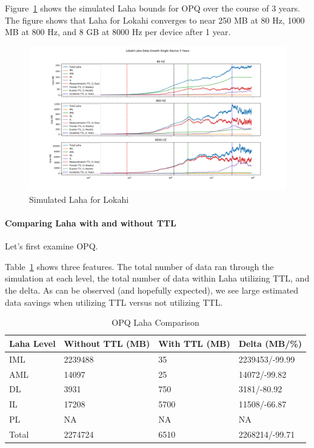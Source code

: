 Figure~\ref{fig:sim_laha_lokahi} shows the simulated Laha bounds for OPQ over the course of 3 years. The figure shows that Laha for Lokahi converges to near 250 MB at 80 Hz, 1000 MB at 800 Hz, and 8 GB at 8000 Hz per device after 1 year.

\begin{figure}[H]
	\centering
	\includegraphics[width=\linewidth]{figures/sim_laha_lokahi.png}
	\caption{Simulated Laha for Lokahi}
	\label{fig:sim_laha_lokahi}
\end{figure}


\paragraph{Comparing Laha with and without TTL}

Let's first examine OPQ\@.

Table~\ref{table:opq_laha_comparison} shows three features. The total number of data ran through the simulation at each level, the total number of data within Laha utilizing TTL, and the delta. As can be observed (and hopefully expected), we see large estimated data savings when utilizing TTL versus not utilizing TTL\@.

\begin{table}[H]
	\centering
	\caption{OPQ Laha Comparison}
	\begin{tabularx}{\textwidth}{Xlll}
		\toprule
		\textbf{Laha Level} & \textbf{Without TTL (MB)} & \textbf{With TTL (MB)} & \textbf{Delta (MB/\%)} \\
		\midrule
		IML & 2239488 & 35 & 2239453/-99.99 \\
		AML & 14097 & 25 & 14072/-99.82\\
		DL & 3931 & 750 & 3181/-80.92 \\
		IL & 17208 & 5700 & 11508/-66.87 \\
		PL & NA & NA & NA \\
		Total & 2274724 & 6510 & 2268214/-99.71 \\
		\bottomrule
	\end{tabularx}
	\label{table:opq_laha_comparison}
\end{table}

